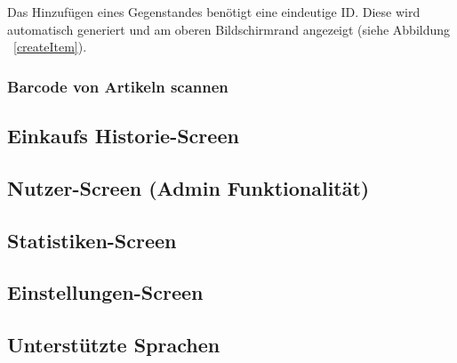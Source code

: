 Das Hinzufügen eines Gegenstandes benötigt eine eindeutige ID. Diese wird automatisch generiert und am oberen Bildschirmrand angezeigt (siehe Abbildung ~\ref{createItem}).


\subsubsection{Barcode von Artikeln scannen} \label{subsubsec:shop-admin-scan-item}


\subsection{Einkaufs Historie-Screen} \label{subsec:purchases-screen}


\subsection{Nutzer-Screen (Admin Funktionalität)} \label{subsec:user-screen}

\subsection{Statistiken-Screen} \label{subsec:statistics-screen}

\subsection{Einstellungen-Screen} \label{subsec:settings-screen}

\subsection{Unterstützte Sprachen} \label{subsec:languages}
